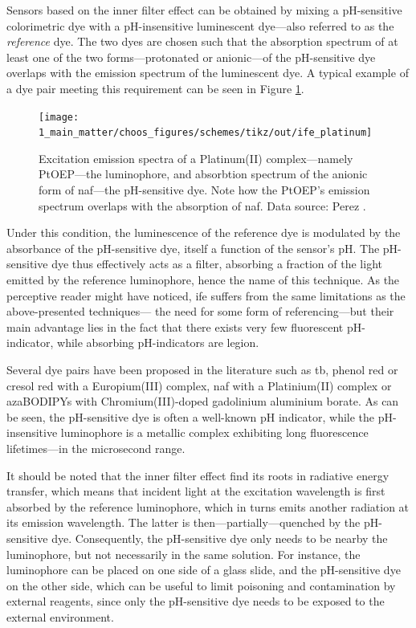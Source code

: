 Sensors based on the inner filter effect can be obtained by mixing a pH-sensitive colorimetric dye with a pH-insensitive luminescent dye---also referred to as the \emph{reference} dye. The two dyes are chosen such that the absorption spectrum of at least one of the two forms---protonated or anionic---of the pH-sensitive dye overlaps with the emission spectrum of the luminescent dye. A typical example of a dye pair meeting this requirement can be seen in Figure \ref{fig:choos:dye_based:advanced:ife_ex}.

\begin{figure}
	\centering
	\texttt{[image: 1\_main\_matter/choos\_figures/schemes/tikz/out/ife\_platinum]}
	\caption[\gls{ife} scheme example.]{Excitation emission spectra of a Platinum(II) complex---namely PtOEP---the luminophore, and absorbtion spectrum of the anionic form of \gls{naf}---the pH-sensitive dye. Note how the PtOEP's emission spectrum overlaps with the absorption of \gls{naf}. Data source: Perez \etal{}\cite{perez2009}.}
	\label{fig:choos:dye_based:advanced:ife_ex}
\end{figure}

Under this condition, the luminescence of the reference dye is modulated by the absorbance of the pH-sensitive dye, itself a function of the sensor's pH. The pH-sensitive dye thus effectively acts as a filter, absorbing a fraction of the light emitted by the reference luminophore, hence the name of this technique. As the perceptive reader might have noticed, \gls{ife} suffers from the same limitations as the above-presented techniques---\ie{} the need for some form of referencing\cite{amao2004}---but their main advantage lies in the fact that there exists very few fluorescent pH-indicator, while absorbing pH-indicators are legion\cite{nakamura2003}.

Several dye pairs have been proposed in the literature such as \gls{tb}, phenol red or cresol red with a Europium(III) complex\cite{nakamura2003}, \gls{naf} with a Platinium(II) complex\cite{perez2009, aguayolopez2014, fernandezramos2018} or azaBODIPYs with Chromium(III)-doped gadolinium aluminium borate. As can be seen, the pH-sensitive dye is often a well-known pH indicator, while the pH-insensitive luminophore is a metallic complex exhibiting long fluorescence lifetimes---in the microsecond range.

It should be noted that the inner filter effect find its roots in radiative energy transfer, which means that incident light at the excitation wavelength is first absorbed by the reference luminophore, which in turns emits another radiation at its emission wavelength. The latter is then---partially---quenched by the pH-sensitive dye. Consequently, the pH-sensitive dye only needs to be nearby the luminophore, but not necessarily in the same solution. For instance, the luminophore can be placed on one side of a glass slide, and the pH-sensitive dye on the other side\cite{nakamura2003, amao2004, amao2005a}, which can be useful to limit poisoning and contamination by external reagents, since only the pH-sensitive dye needs to be exposed to the external environment.

